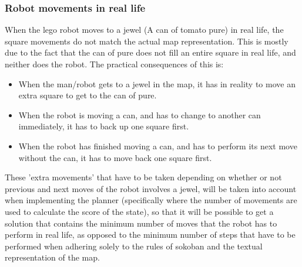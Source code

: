 \subsubsection{Robot movements in real life}
When the lego robot moves to a jewel (A can of tomato pure) in real life, the square movements do not match the actual map representation. This is mostly due to the fact that the can of pure does not fill an entire square in real life, and neither does the robot. The practical consequences of this is:
\begin{itemize}
\item When the man/robot gets to a jewel in the map, it has in reality to move an extra square to get to the can of pure.
\item When the robot is moving a can, and has to change to another can immediately, it has to back up one square first.
\item When the robot has finished moving a can, and has to perform its next move without the can, it has to move back one square first.
\end{itemize}
 
These 'extra movements' that have to be taken depending on whether or not previous and next moves of the robot involves a jewel,  will be taken into account when implementing the planner (specifically where the number of movements are used to calculate the score of the state), so that it will be possible to get a solution that contains the minimum number of moves that the robot has to perform in real life, as opposed to the minimum number of steps that have to be performed when adhering solely to the rules of sokoban and the textual representation of the map.

